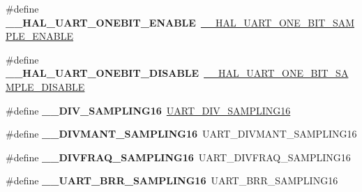 \begin{DoxyCompactItemize}
\item 
\mbox{\label{group___h_a_l___u_a_r_t___aliased___defines_gaf1ec2145d7a73ee2f74ec334c8210092}} 
\#define {\bfseries \+\_\+\+\_\+\+H\+A\+L\+\_\+\+U\+A\+R\+T\+\_\+\+O\+N\+E\+B\+I\+T\+\_\+\+E\+N\+A\+B\+LE}~\hyperlink{group___u_a_r_t___exported___macros_ga3524747e5896296ab066d786431503ce}{\+\_\+\+\_\+\+H\+A\+L\+\_\+\+U\+A\+R\+T\+\_\+\+O\+N\+E\+\_\+\+B\+I\+T\+\_\+\+S\+A\+M\+P\+L\+E\+\_\+\+E\+N\+A\+B\+LE}
\item 
\mbox{\label{group___h_a_l___u_a_r_t___aliased___defines_ga93fcc521745111012558544b198be1ce}} 
\#define {\bfseries \+\_\+\+\_\+\+H\+A\+L\+\_\+\+U\+A\+R\+T\+\_\+\+O\+N\+E\+B\+I\+T\+\_\+\+D\+I\+S\+A\+B\+LE}~\hyperlink{group___u_a_r_t___exported___macros_ga2dbd7e6592e8c5999f817b69f0fd24bb}{\+\_\+\+\_\+\+H\+A\+L\+\_\+\+U\+A\+R\+T\+\_\+\+O\+N\+E\+\_\+\+B\+I\+T\+\_\+\+S\+A\+M\+P\+L\+E\+\_\+\+D\+I\+S\+A\+B\+LE}
\item 
\mbox{\label{group___h_a_l___u_a_r_t___aliased___defines_ga95b08a06aee2ed42542ac95224cf13a8}} 
\#define {\bfseries \+\_\+\+\_\+\+D\+I\+V\+\_\+\+S\+A\+M\+P\+L\+I\+N\+G16}~\hyperlink{group___u_a_r_t___private___macros_gac2423ff86559eb91198bcc438caec865}{U\+A\+R\+T\+\_\+\+D\+I\+V\+\_\+\+S\+A\+M\+P\+L\+I\+N\+G16}
\item 
\mbox{\label{group___h_a_l___u_a_r_t___aliased___defines_gaae0a8a1c78ef85c5d4e980f123dce2cb}} 
\#define {\bfseries \+\_\+\+\_\+\+D\+I\+V\+M\+A\+N\+T\+\_\+\+S\+A\+M\+P\+L\+I\+N\+G16}~U\+A\+R\+T\+\_\+\+D\+I\+V\+M\+A\+N\+T\+\_\+\+S\+A\+M\+P\+L\+I\+N\+G16
\item 
\mbox{\label{group___h_a_l___u_a_r_t___aliased___defines_ga165ca293ce5aa1dc825ce6e69f104f99}} 
\#define {\bfseries \+\_\+\+\_\+\+D\+I\+V\+F\+R\+A\+Q\+\_\+\+S\+A\+M\+P\+L\+I\+N\+G16}~U\+A\+R\+T\+\_\+\+D\+I\+V\+F\+R\+A\+Q\+\_\+\+S\+A\+M\+P\+L\+I\+N\+G16
\item 
\mbox{\label{group___h_a_l___u_a_r_t___aliased___defines_ga4ef81a279eab794f777deede4ef777cd}} 
\#define {\bfseries \+\_\+\+\_\+\+U\+A\+R\+T\+\_\+\+B\+R\+R\+\_\+\+S\+A\+M\+P\+L\+I\+N\+G16}~U\+A\+R\+T\+\_\+\+B\+R\+R\+\_\+\+S\+A\+M\+P\+L\+I\+N\+G16

\end{DoxyCompactItemize}
